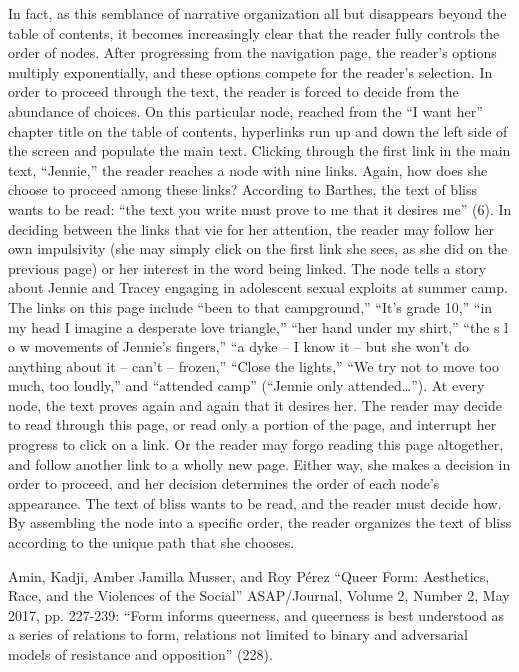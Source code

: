 \documentclass[11pt]{article}
\begin{document}
In fact, as this semblance of narrative organization all but
disappears beyond the table of contents, it becomes increasingly clear
that the reader fully controls the order of nodes. After progressing
from the navigation page, the reader’s options multiply exponentially,
and these options compete for the reader’s selection. In order to
proceed through the text, the reader is forced to decide from the
abundance of choices. On this particular node, reached from the “I
want her” chapter title on the table of contents, hyperlinks run up
and down the left side of the screen and populate the main
text. Clicking through the first link in the main text, “Jennie,” the
reader reaches a node with nine links. Again, how does she choose to
proceed among these links? According to Barthes, the text of bliss
wants to be read: “the text you write must prove to me that it desires
me” (6). In deciding between the links that vie for her attention, the
reader may follow her own impulsivity (she may simply click on the
first link she sees, as she did on the previous page) or her interest
in the word being linked. The node tells a story about Jennie and
Tracey engaging in adolescent sexual exploits at summer camp. The
links on this page include “been to that campground,” “It's grade 10,”
“in my head I imagine a desperate love triangle,” “her hand under my
shirt,” “the s l o w movements of Jennie's fingers,” “a dyke -- I know
it -- but she won't do anything about it -- can't -- frozen,” “Close
the lights,” “We try not to move too much, too loudly,” and “attended
camp” (“Jennie only attended…”). At every node, the text proves again
and again that it desires her. The reader may decide to read through
this page, or read only a portion of the page, and interrupt her
progress to click on a link. Or the reader may forgo reading this page
altogether, and follow another link to a wholly new page. Either way,
she makes a decision in order to proceed, and her decision determines
the order of each node’s appearance. The text of bliss wants to be
read, and the reader must decide how. By assembling the node into a
specific order, the reader organizes the text of bliss according to
the unique path that she chooses.


Amin, Kadji, Amber Jamilla Musser, and Roy Pérez “Queer Form:
Aesthetics, Race, and the Violences of the Social” ASAP/Journal,
Volume 2, Number 2, May 2017, pp. 227-239: “Form informs queerness,
and queerness is best understood as a series of relations to form,
relations not limited to binary and adversarial models of resistance
and opposition” (228).
\end{document}
